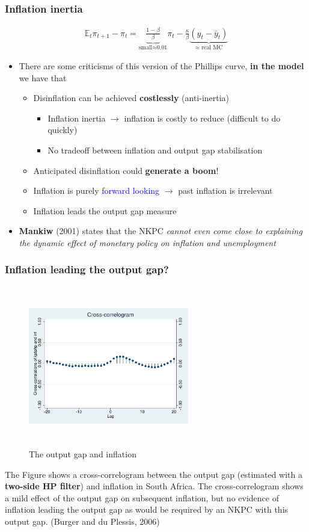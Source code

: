 \documentclass[10pt, xcolor=x11names, table]{beamer}
\begin{document}
\begin{frame}
\frametitle{Inflation inertia}
\begin{align*}
\mathbb{E}_{t}\pi_{t+1} - \pi_{t} = \underbrace{\frac{1-\beta}{\beta}}_\text{small$\approx$0.01} \pi_{t} - \frac{\kappa}{\beta}\underbrace{(y_{t} - \bar{y}_{t})}_\text{$\approx$ real MC}
\end{align*}
\begin{itemize}
  \item There are some criticisms of this version of the Phillips curve, \textbf{in the model} we have that
  \begin{itemize}
\item Disinflation can be achieved \textbf{costlessly} (anti-inertia)
\begin{itemize}
\item Inflation inertia $\rightarrow$ inflation is costly to reduce (difficult to do quickly)
\item No tradeoff between inflation and output gap stabilisation
\end{itemize}
\item Anticipated disinflation could \textbf{generate a boom}!
\item Inflation is purely \textcolor{blue}{forward looking} $\rightarrow$ past inflation is irrelevant
\item Inflation leads the output gap measure
\end{itemize}
\item \textbf{Mankiw} (2001) states that the NKPC \emph{cannot even come close to explaining the dynamic effect of monetary policy on inflation and unemployment}
\end{itemize}
\end{frame}


\begin{frame}
\frametitle{Inflation leading the output gap?}
\begin{figure}
\centering
\includegraphics[width=7cm, height=7cm, keepaspectratio]{images/xcorr}
\caption{The output gap and inflation}
\end{figure}
{\footnotesize{The Figure shows a cross-correlogram between the output gap (estimated with a \textbf{two-side HP filter}) and inflation in South Africa. The cross-correlogram shows a mild effect of the output gap on subsequent inflation, but no evidence of inflation leading the output gap as would be required by an NKPC with this output gap. (Burger and du Plessis, 2006)}}
\end{frame}
\end{document}
